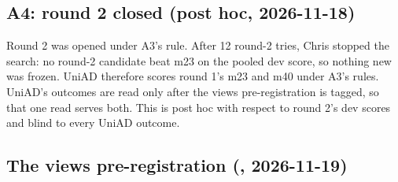 \subsection{A4: round 2 closed (post hoc, 2026-11-18)}

Round 2 was opened under A3's rule. After 12 round-2 tries, Chris stopped the
search: no round-2 candidate beat m23 on the pooled dev score, so nothing new was
frozen.
UniAD therefore scores round 1's m23 and m40 under A3's rules. UniAD's outcomes
are read only after the views pre-registration is tagged, so that one read
serves both. This is post hoc with respect to round 2's dev scores and blind to
every UniAD outcome.

\subsection{The views pre-registration (, 2026-11-19)}
\label{sec:prereg-views}


